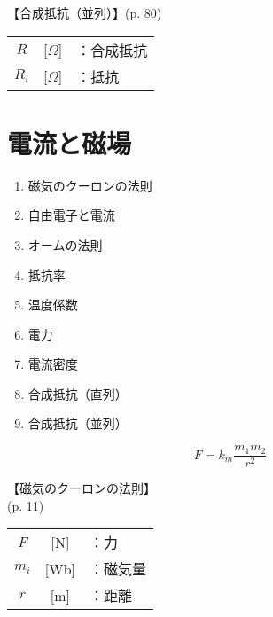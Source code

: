 \documentclass[10pt]{jarticle}
\begin{document}
\vskip3mm
【合成抵抗（並列）】{\footnotesize (p. 80)}

\begin{tabular}{ccl}
$R$	&[$\Omega$]	&：合成抵抗 \\
$R_i$	&[$\Omega$]	&：抵抗 \\
\end{tabular}








\newpage
\addtocounter{page}{-1}
\thispagestyle{empty}
\section{電流と磁場}

\begin{enumerate}
\setcounter{enumi}{\thepage}
\small
\itemsep-4mm
\item 磁気のクーロンの法則 \\
\item 自由電子と電流 \\
\item オームの法則 \\
\item 抵抗率 \\
\item 温度係数 \\
\item 電力 \\
\item 電流密度 \\
\item 合成抵抗（直列） \\
\item 合成抵抗（並列） \\
\end{enumerate}



\newpage
\[
F = k_m \frac{m_1 m_2}{r^2}
\]


\vskip3mm
【磁気のクーロンの法則】\\
\hfill {\footnotesize (p. 11)}

\begin{tabular}{ccl}
$F$	&[N]	&：力 \\
$m_i$	&[Wb]	&：磁気量 \\
$r$	&[m]	&：距離
\end{tabular}
\end{document}
